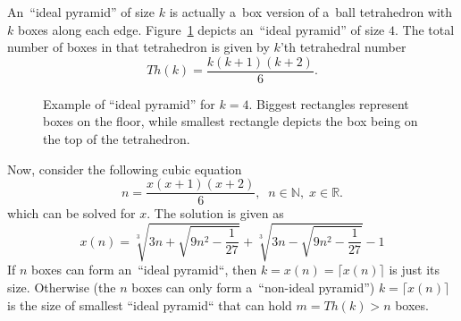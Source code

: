 \documentclass[paper=a4,DIV=12]{leetcode}
\begin{document}
An~``ideal pyramid'' of size $k$ is actually a~box version of a~ball
tetrahedron with $k$ boxes along each edge. Figure~\ref{fig:7YP7N} depicts
an~``ideal pyramid'' of size $4$. The total number of boxes in that
tetrahedron is given by $k$'th tetrahedral number~\cite{enwiki:1226358199}
\begin{equation}
  Th(k) = \frac{k(k+1)(k+2)}{6}.
  \label{eq:BP9CM}
\end{equation}
\begin{figure}[htbp]
  \centering
  \caption{Example of ``ideal pyramid'' for $k=4$. Biggest rectangles
  represent boxes on the floor, while smallest rectangle depicts the box being
  on the top of the tetrahedron.}
  \label{fig:7YP7N}
\end{figure}
Now, consider the following cubic equation
\begin{equation}
  n = \frac{x(x+1)(x+2)}{6},\;\;n \in \mathbb{N}, \; x \in \mathbb{R}.
 \label{eq:X27S1}
\end{equation}
which can be solved for $x$. The solution is given as~\cite{enwiki:1226358199}
\begin{equation}
  x(n) = \sqrt[3]{3 n + \sqrt{9 n^2 - \frac{1}{27}}} + \sqrt[3]{3 n - \sqrt{9 n^2 - \frac{1}{27}}} - 1
  \label{eq:8FFEH}
\end{equation}
If $n$ boxes can form an~``ideal pyramid``, then $k = x(n) = \lceil{x(n)}\rceil$
is just its size. Otherwise (the $n$ boxes can only form a~``non-ideal pyramid'')
$k = \lceil{x(n)}\rceil$ is the size of smallest ``ideal pyramid`` that can
hold $m = Th(k) > n$ boxes.
\end{document}
